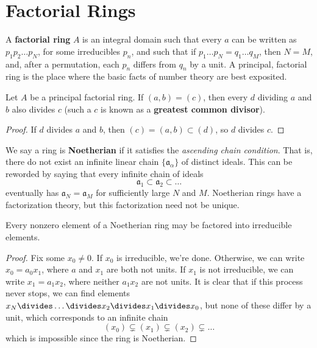 \section{Factorial Rings}

A {\bf factorial ring} $A$ is an integral domain such that every $a$ can be written as $p_1 p_2 \dots p_N$, for some irreducibles $p_n$, and such that if $p_1 \dots p_N = q_1 \dots q_M$, then $N = M$, and, after a permutation, each $p_n$ differs from $q_n$ by a unit. A principal, factorial ring is the place where the basic facts of number theory are best exposited.

\begin{theorem}
    Let $A$ be a principal factorial ring. If $(a,b) = (c)$, then every $d$ dividing $a$ and $b$ also divides $c$ (such a $c$ is known as a {\bf greatest common divisor}).
\end{theorem}
\begin{proof}
    If $d$ divides $a$ and $b$, then $(c) = (a,b) \subset (d)$, so $d$ divides $c$.
\end{proof}

We say a ring is {\bf Noetherian} if it satisfies the {\it ascending chain condition}. That is, there do not exist an infinite linear chain $\{ \mathfrak{a}_\alpha \}$ of distinct ideals. This can be reworded by saying that every infinite chain of ideals
%
\[ \mathfrak{a}_1 \subset \mathfrak{a}_2 \subset \dots \]
%
eventually has $\mathfrak{a}_N = \mathfrak{a}_M$ for sufficiently large $N$ and $M$. Noetherian rings have a factorization theory, but this factorization need not be unique.

\begin{theorem}
    Every nonzero element of a Noetherian ring may be factored into irreducible elements.
\end{theorem}
\begin{proof}
    Fix some $x_0 \neq 0$. If $x_0$ is irreducible, we're done. Otherwise, we can write $x_0 = a_0x_1$, where $a$ and $x_1$ are both not units. If $x_1$ is not irreducible, we can write $x_1 = a_1x_2$, where neither $a_1x_2$ are not units. It is clear that if this process never stops, we can find elements $x_N \divides \dots \divides x_2 \divides x_1 \divides x_0$, but none of these differ by a unit, which corresponds to an infinite chain
    \[ (x_0) \subsetneq (x_1) \subsetneq (x_2) \subsetneq \dots \]
    which is impossible since the ring is Noetherian.
\end{proof}

